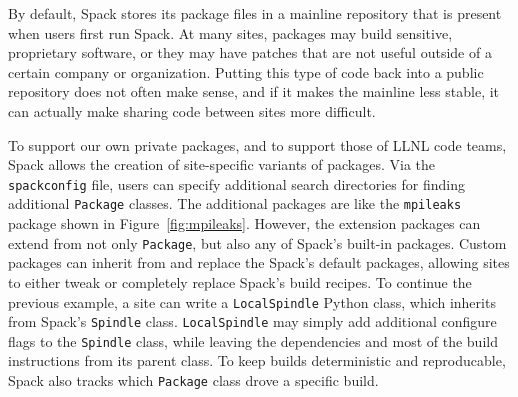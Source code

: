 By default, Spack stores its package files in a mainline repository that is present when users
first run Spack.  At many sites, packages may build sensitive, proprietary software, or they 
may have patches that are not useful outside of a certain company or organization.  Putting
this type of code back into a public repository does not often make sense, and if it makes the
mainline less stable, it can actually make sharing code between sites more difficult.  

To support our own private packages, and to support those of LLNL code teams, Spack allows the creation of site-specific variants of packages.  Via the {\tt spackconfig} file, users can specify additional search directories for finding additional {\tt Package} classes.
%
The additional packages are like the {\tt mpileaks} package shown in Figure~\ref{fig:mpileaks}.  However, the extension packages can extend from not only {\tt Package}, but also any of Spack's built-in packages.   Custom packages can inherit from and replace the Spack's default packages, allowing sites to either tweak or completely replace Spack's build recipes.  To continue the previous example, a site can write a {\tt LocalSpindle} Python class, which inherits from Spack's {\tt Spindle} class.  {\tt LocalSpindle} may simply add additional configure flags to the {\tt Spindle} class, while leaving the dependencies and most of the build instructions from its parent class.  To keep builds deterministic and reproducable, Spack also tracks which {\tt Package} class drove a specific build. 






